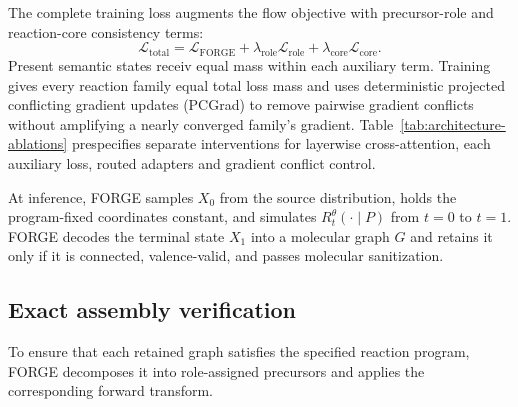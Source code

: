 \documentclass{article}
\begin{document}
The complete training loss augments the flow objective with precursor-role and reaction-core
consistency terms:
\begin{equation}
    \mathcal L_{\mathrm{total}}
    = \mathcal L_{\mathrm{FORGE}}
    + \lambda_{\mathrm{role}}\mathcal L_{\mathrm{role}}
    + \lambda_{\mathrm{core}}\mathcal L_{\mathrm{core}}.
\end{equation}
Present semantic states receiv equal mass within each auxiliary term. Training gives every reaction
family equal total loss mass and uses deterministic projected conflicting gradient updates (PCGrad)
to remove pairwise gradient conflicts without amplifying a nearly converged family's gradient.
Table~\ref{tab:architecture-ablations} prespecifies separate interventions for layerwise
cross-attention, each auxiliary loss, routed adapters and gradient conflict control.

At inference, FORGE samples $X_0$ from the source distribution, holds the program-fixed coordinates
constant, and simulates $R_t^\theta(\cdot\mid P)$ from $t=0$ to $t=1$.
FORGE decodes the terminal state $X_1$ into a molecular graph $G$ and retains it only if it is
connected, valence-valid, and passes molecular sanitization.

\subsection{Exact assembly verification}

To ensure that each retained graph satisfies the specified reaction program, FORGE decomposes it
into role-assigned precursors and applies the corresponding forward transform.
\end{document}
